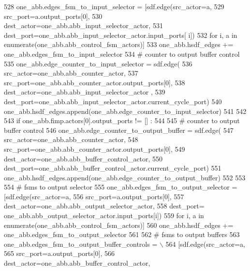 \begin{DoxyCode}
528     one\_abb.edges\_fsm\_to\_input\_selector = [sdf.edge(src\_actor=a,
529                                                     src\_port=a.output\_ports[0],
530                                                     dest\_actor=one\_abb.abb\_input\_selector\_actor,
531                                                     dest\_port=one\_abb.abb\_input\_selector\_actor.input\_ports[
      i])
532                                            \textcolor{keywordflow}{for} i, a \textcolor{keywordflow}{in} enumerate(one\_abb.abb\_control\_fsm\_actors)]
533     one\_abb.hsdf\_edges += one\_abb.edges\_fsm\_to\_input\_selector
534     \textcolor{comment}{# counter to output buffer control}
535     one\_abb.edge\_counter\_to\_input\_selector = sdf.edge(
536       src\_actor=one\_abb.abb\_counter\_actor,
537       src\_port=one\_abb.abb\_counter\_actor.output\_ports[0],
538       dest\_actor=one\_abb.abb\_input\_selector\_actor ,
539       dest\_port=one\_abb.abb\_input\_selector\_actor.current\_cycle\_port)
540     one\_abb.hsdf\_edges.append(one\_abb.edge\_counter\_to\_input\_selector)
541 
542 
543   \textcolor{keywordflow}{if} one\_abb.fimp.actors[0].output\_ports != [] :
544 
545     \textcolor{comment}{# counter to output buffer control}
546     one\_abb.edge\_counter\_to\_output\_buffer = sdf.edge(
547       src\_actor=one\_abb.abb\_counter\_actor,
548       src\_port=one\_abb.abb\_counter\_actor.output\_ports[0],
549       dest\_actor=one\_abb.abb\_buffer\_control\_actor,
550       dest\_port=one\_abb.abb\_buffer\_control\_actor.current\_cycle\_port)
551     one\_abb.hsdf\_edges.append(one\_abb.edge\_counter\_to\_output\_buffer)
552 
553 
554     \textcolor{comment}{# fsms to output selector}
555     one\_abb.edges\_fsm\_to\_output\_selector = [sdf.edge(src\_actor=a,
556                                                      src\_port=a.output\_ports[0],
557                                                      dest\_actor=one\_abb.abb\_output\_selector\_actor,
558                                                      dest\_port=
      one\_abb.abb\_output\_selector\_actor.input\_ports[i])
559                                             \textcolor{keywordflow}{for} i, a \textcolor{keywordflow}{in} enumerate(one\_abb.abb\_control\_fsm\_actors)]
560     one\_abb.hsdf\_edges += one\_abb.edges\_fsm\_to\_output\_selector
561 
562     \textcolor{comment}{# fsms to output buffers}
563     one\_abb.edges\_fsm\_to\_output\_buffer\_controls = \(\backslash\)
564         [sdf.edge(src\_actor=a,
565                   src\_port=a.output\_ports[0],
566                   dest\_actor=one\_abb.abb\_buffer\_control\_actor,

\end{DoxyCode}
